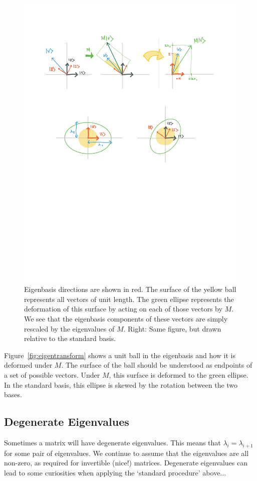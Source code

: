 \documentclass[12pt]{article}
\begin{document}
\begin{figure}[tb]
    \centering
    \includegraphics[width=.6\textwidth]{figures/eigen_ball.pdf}
    \caption{Eigenbasis directions are shown in red. The surface of the yellow ball represents all vectors of unit length. The green ellipse represents the deformation of this surface by acting on each of those vectors by $M$. We see that the eigenbasis components of these vectors are simply rescaled by the eigenvalues of $M$. Right: Same figure, but drawn relative to the standard basis.}
    \label{fig:eigenbal}
\end{figure}

Figure~\ref{fig:eigentransform} shows a unit ball in the eigenbasis and how it is deformed under $M$. The surface of the ball should be understood as endpoints of a set of possible vectors. Under $M$, this surface is deformed to the green ellipse. In the standard basis, this ellipse is skewed by the rotation between the two bases. 






\subsection{Degenerate Eigenvalues}

Sometimes a matrix will have degenerate eigenvalues. This means that $\lambda_i = \lambda_{i+1}$ for some pair of eigenvalues. We continue to assume that the eigenvalues are all non-zero, as required for invertible (nice!) matrices.  Degenerate eigenvalues can lead to some curiosities when applying the `standard procedure' above...
\end{document}
